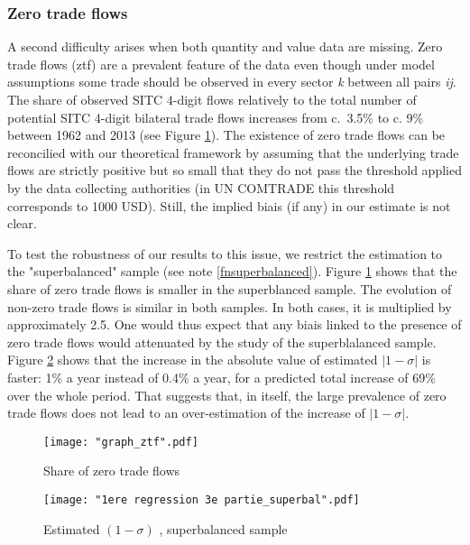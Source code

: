 \documentclass[12pt,twoside,a4paper,notitlepage]{article}
\begin{document}
\subsubsection{ Zero trade flows}
A second difficulty arises when both quantity and value data are missing.
Zero trade flows (ztf) are a prevalent feature of the data even though under model assumptions some trade should be observed in every sector \textit{k} between all pairs \textit{ij}.
The share of observed SITC 4-digit flows relatively to the total number of potential SITC 4-digit bilateral trade flows increases from c. 3.5\% to c. 9\% between 1962 and 2013 (see Figure \ref{fig:share_of_ztf}).
The existence of zero trade flows can be reconcilied with our theoretical framework by assuming that the underlying trade flows are strictly positive but so small that they do not pass the threshold applied by the data collecting authorities (in UN COMTRADE this threshold corresponds to 1000 USD).
Still, the implied biais (if any) in our estimate is not clear. 

To test the robustness of our results to this issue, we restrict the estimation to the "superbalanced" sample (see note \ref{fnsuperbalanced}). 
Figure \ref{fig:share_of_ztf} shows that the share of zero trade flows is smaller in the superblanced sample.
The evolution of non-zero trade flows is similar in both samples.
In both cases, it is multiplied by approximately 2.5.
One would thus expect that any biais linked to the presence of zero trade flows would attenuated by the study of the superblalanced sample.
Figure \ref{fig:reg_superbal} shows that the increase in the absolute value of estimated $|1-\sigma|$ is faster: 1\% a year instead of 0.4\% a year, for a predicted total increase of 69\% over the whole period. That suggests that, in itself, the large prevalence of zero trade flows does not lead to an over-estimation of the increase of $|1-\sigma|$.

\begin{figure} [H]
	\caption{Share of zero trade flows}
	\texttt{[image: "graph\_ztf".pdf]}
	\label{fig:share_of_ztf}
\end{figure}


\begin{figure} [H]
	\caption{Estimated $(1-\sigma)$ , superbalanced sample}
	\texttt{[image: "1ere regression 3e partie\_superbal".pdf]}
	\label{fig:reg_superbal}
\end{figure}
\end{document}

